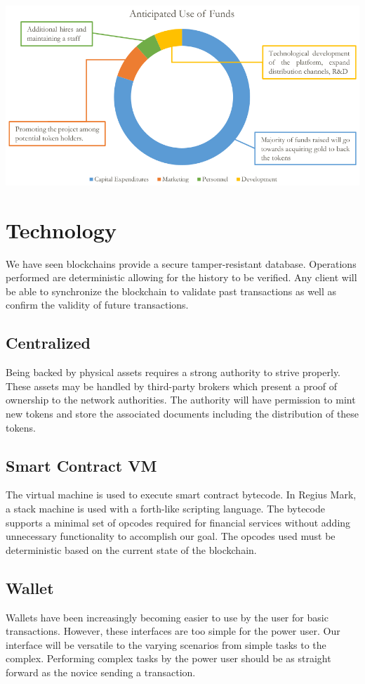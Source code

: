 \documentclass[12pt,a4paper]{article}
\begin{document}
  \vspace{5mm}
  \includegraphics[width=\linewidth]{anticipated-use-of-funds.png}

  \section{Technology}
  We have seen blockchains provide a secure tamper-resistant database.
  Operations performed are deterministic allowing for the history to be
  verified. Any client will be able to synchronize the blockchain to validate
  past transactions as well as confirm the validity of future transactions.\\

  \subsection{Centralized}
  Being backed by physical assets requires a strong authority to strive
  properly. These assets may be handled by third-party brokers which present a
  proof of ownership to the network authorities. The authority will have
  permission to mint new tokens and store the associated documents including
  the distribution of these tokens.

  \subsection{Smart Contract VM}
  The virtual machine is used to execute smart contract bytecode. In Regius
  Mark, a stack machine is used with a forth-like scripting language. The
  bytecode supports a minimal set of opcodes required for financial services
  without adding unnecessary functionality to accomplish our goal. The opcodes
  used must be deterministic based on the current state of the blockchain.

  \subsection{Wallet}
  Wallets have been increasingly becoming easier to use by the user for
  basic transactions. However, these interfaces are too simple for the power
  user. Our interface will be versatile to the varying scenarios from simple
  tasks to the complex. Performing complex tasks by the power user should be as
  straight forward as the novice sending a transaction.\\
\end{document}
